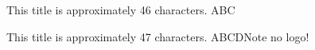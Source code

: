 \documentclass{beamer}
\newcommand{\backupbegin}{
    \newcounter{framenumberappendix}
    \setcounter{framenumberappendix}{\value{framenumber}}
}
\newcommand{\backupend}{
    \addtocounter{framenumberappendix}{-\value{framenumber}}
    \addtocounter{framenumber}{\value{framenumberappendix}} 
}
\begin{document}
\begin{frame}{%
This title is approximately 46 characters. ABC}
\end{frame}
\begin{frame}{%
This title is approximately 47 characters. ABCD}{Note no logo!}
\end{frame}


%
%
\end{document}
